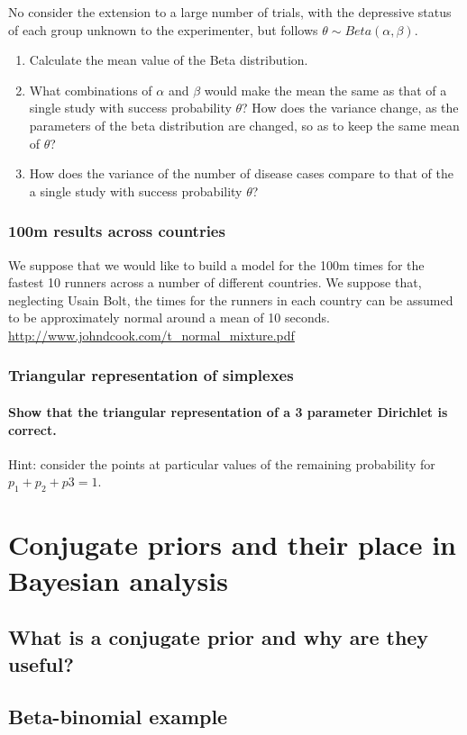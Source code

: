 \documentclass[11pt,fullpage]{book}
\begin{document}
No consider the extension to a large number of trials, with the depressive status of each group unknown to the experimenter, but follows $\theta\sim Beta(\alpha,\beta)$.

\begin{enumerate}
\item Calculate the mean value of the Beta distribution.
\item What combinations of $\alpha$ and $\beta$ would make the mean the same as that of a single study with success probability $\theta$?
How does the variance change, as the parameters of the beta distribution are changed, so as to keep the same mean of $\theta$?
\item How does the variance of the number of disease cases compare to that of the a single study with success probability $\theta$?
\end{enumerate}

\subsection{100m results across countries}
We suppose that we would like to build a model for the 100m times for the fastest 10 runners across a number of different countries. We suppose that, neglecting Usain Bolt, the times for the runners in each country can be assumed to be approximately normal around a mean of 10 seconds. \url{http://www.johndcook.com/t_normal_mixture.pdf}

\subsection{Triangular representation of simplexes}
\subsubsection{Show that the triangular representation of a 3 parameter Dirichlet is correct.}
Hint: consider the points at particular values of the remaining probability for $p_1+p_2+p3=1$.

\chapter{Conjugate priors and their place in Bayesian analysis}\label{chap:conjugate}
\section{What is a conjugate prior and why are they useful?}
\section{Beta-binomial example}
\end{document}
